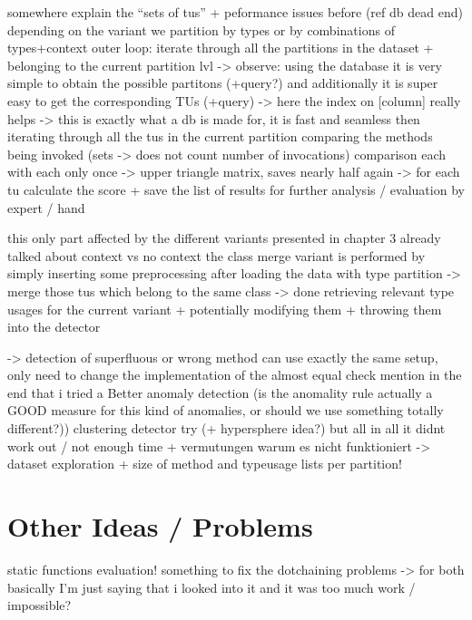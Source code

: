 somewhere explain the ``sets of tus'' + peformance issues before (ref db dead end)
depending on the variant we partition by types or by combinations of types+context
outer loop: iterate through all the partitions in the dataset + belonging to the current partition lvl
-> observe: using the database it is very simple to obtain the possible partitons (+query?)
and additionally it is super easy to get the corresponding TUs (+query) -> here the index on [column] really helps
-> this is exactly what a db is made for, it is fast and seamless
then iterating through all the tus in the current partition
comparing the methods being invoked (sets -> does not count number of invocations)
comparison each with each only once -> upper triangle matrix, saves nearly half again
-> for each tu calculate the score + save the list of results for further analysis / evaluation by expert / hand

this only part affected by the different variants presented in chapter 3
already talked about context vs no context
the class merge variant is performed by simply inserting some preprocessing after loading the data with type partition
-> merge those tus which belong to the same class -> done
retrieving relevant type usages for the current variant + potentially modifying them + throwing them into the detector

-> detection of superfluous or wrong method can use exactly the same setup, only need to change the implementation of the almost equal check
mention in the end that i tried a 
Better anomaly detection (is the anomality rule actually a GOOD measure for this kind of anomalies, or should we use something totally different?))
    clustering detector try (+ hypersphere idea?)
    but all in all it didnt work out / not enough time
    + vermutungen warum es nicht funktioniert -> dataset exploration + size of method and typeusage lists per partition!

\section{Other Ideas / Problems}

static functions evaluation!
something to fix the dotchaining problems
-> for both basically I'm just saying that i looked into it and it was too much work / impossible?
